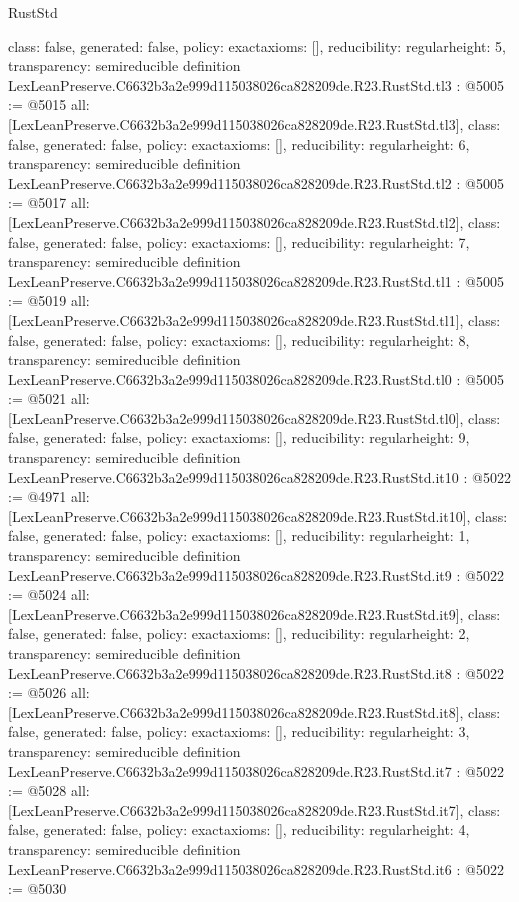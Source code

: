\begin{lexlean}{RustStd}
\begin{coremodule}
{  class: false,
  generated: false,
  policy: exact{axioms: []},
  reducibility: regular{height: 5},
  transparency: semireducible
}
definition LexLeanPreserve.C6632b3a2e999d115038026ca828209de.R23.RustStd.tl3 : @5005 := @5015 {
  all: [LexLeanPreserve.C6632b3a2e999d115038026ca828209de.R23.RustStd.tl3],
  class: false,
  generated: false,
  policy: exact{axioms: []},
  reducibility: regular{height: 6},
  transparency: semireducible
}
definition LexLeanPreserve.C6632b3a2e999d115038026ca828209de.R23.RustStd.tl2 : @5005 := @5017 {
  all: [LexLeanPreserve.C6632b3a2e999d115038026ca828209de.R23.RustStd.tl2],
  class: false,
  generated: false,
  policy: exact{axioms: []},
  reducibility: regular{height: 7},
  transparency: semireducible
}
definition LexLeanPreserve.C6632b3a2e999d115038026ca828209de.R23.RustStd.tl1 : @5005 := @5019 {
  all: [LexLeanPreserve.C6632b3a2e999d115038026ca828209de.R23.RustStd.tl1],
  class: false,
  generated: false,
  policy: exact{axioms: []},
  reducibility: regular{height: 8},
  transparency: semireducible
}
definition LexLeanPreserve.C6632b3a2e999d115038026ca828209de.R23.RustStd.tl0 : @5005 := @5021 {
  all: [LexLeanPreserve.C6632b3a2e999d115038026ca828209de.R23.RustStd.tl0],
  class: false,
  generated: false,
  policy: exact{axioms: []},
  reducibility: regular{height: 9},
  transparency: semireducible
}
definition LexLeanPreserve.C6632b3a2e999d115038026ca828209de.R23.RustStd.it10 : @5022 := @4971 {
  all: [LexLeanPreserve.C6632b3a2e999d115038026ca828209de.R23.RustStd.it10],
  class: false,
  generated: false,
  policy: exact{axioms: []},
  reducibility: regular{height: 1},
  transparency: semireducible
}
definition LexLeanPreserve.C6632b3a2e999d115038026ca828209de.R23.RustStd.it9 : @5022 := @5024 {
  all: [LexLeanPreserve.C6632b3a2e999d115038026ca828209de.R23.RustStd.it9],
  class: false,
  generated: false,
  policy: exact{axioms: []},
  reducibility: regular{height: 2},
  transparency: semireducible
}
definition LexLeanPreserve.C6632b3a2e999d115038026ca828209de.R23.RustStd.it8 : @5022 := @5026 {
  all: [LexLeanPreserve.C6632b3a2e999d115038026ca828209de.R23.RustStd.it8],
  class: false,
  generated: false,
  policy: exact{axioms: []},
  reducibility: regular{height: 3},
  transparency: semireducible
}
definition LexLeanPreserve.C6632b3a2e999d115038026ca828209de.R23.RustStd.it7 : @5022 := @5028 {
  all: [LexLeanPreserve.C6632b3a2e999d115038026ca828209de.R23.RustStd.it7],
  class: false,
  generated: false,
  policy: exact{axioms: []},
  reducibility: regular{height: 4},
  transparency: semireducible
}
definition LexLeanPreserve.C6632b3a2e999d115038026ca828209de.R23.RustStd.it6 : @5022 := @5030 {
}
\end{coremodule}
\end{lexlean}
